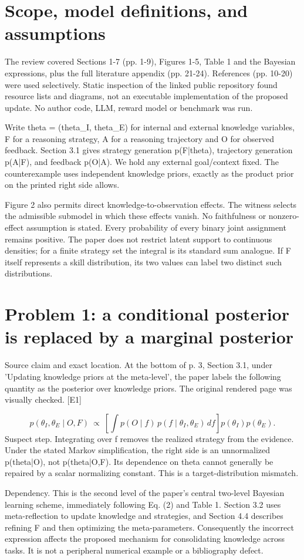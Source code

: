 \documentclass[10pt]{article}
\begin{document}
\section*{Scope, model definitions, and assumptions}
The review covered Sections 1-7 (pp. 1-9), Figures 1-5, Table 1 and the Bayesian expressions, plus the full literature appendix (pp. 21-24). References (pp. 10-20) were used selectively. Static inspection of the linked public repository found resource lists and diagrams, not an executable implementation of the proposed update. No author code, LLM, reward model or benchmark was run.\par
Write theta = (theta\_I, theta\_E) for internal and external knowledge variables, F for a reasoning strategy, A for a reasoning trajectory and O for observed feedback. Section 3.1 gives strategy generation p(F|theta), trajectory generation p(A|F), and feedback p(O|A). We hold any external goal/context fixed. The counterexample uses independent knowledge priors, exactly as the product prior on the printed right side allows.\par
Figure 2 also permits direct knowledge-to-observation effects. The witness selects the admissible submodel in which these effects vanish. No faithfulness or nonzero-effect assumption is stated. Every probability of every binary joint assignment remains positive. The paper does not restrict latent support to continuous densities; for a finite strategy set the integral is its standard sum analogue. If F itself represents a skill distribution, its two values can label two distinct such distributions.\par
\section*{Problem 1: a conditional posterior is replaced by a marginal posterior}
Source claim and exact location. At the bottom of p. 3, Section 3.1, under ’Updating knowledge priors at the meta-level’, the paper labels the following quantity as the posterior over knowledge priors. The original rendered page was visually checked. [E1]\par
\[p(\theta_I,\theta_E\mid O,F)\ \propto\ \left[\int p(O\mid f)\,p(f\mid\theta_I,\theta_E)\,df\right]p(\theta_I)p(\theta_E).\] Suspect step. Integrating over f removes the realized strategy from the evidence. Under the stated Markov simplification, the right side is an unnormalized p(theta|O), not p(theta|O,F). Its dependence on theta cannot generally be repaired by a scalar normalizing constant. This is a target-distribution mismatch.\par
Dependency. This is the second level of the paper’s central two-level Bayesian learning scheme, immediately following Eq. (2) and Table 1. Section 3.2 uses meta-reflection to update knowledge and strategies, and Section 4.4 describes refining F and then optimizing the meta-parameters. Consequently the incorrect expression affects the proposed mechanism for consolidating knowledge across tasks. It is not a peripheral numerical example or a bibliography defect.\par
\end{document}
